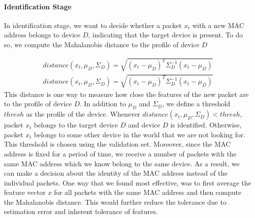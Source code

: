 \paragraph{Identification Stage} In identification stage, we want to decide whether a packet $x_t$ with a new MAC address belongs to device $D$, indicating that the target device is present. To do so, we compute the Mahalanobis distance to the profile of device $D$

\begin{gather*}
    distance(x_t,\mu_D,\Sigma_D) = \sqrt{(x_t-\mu_D)^T\Sigma_D^{-1}(x_t-\mu_D)}
\end{gather*}
\begin{gather*}
    distance(x_t,\mu_D,\Sigma_D) = \sqrt{(x_t-\mu_D)^T\Sigma_D^{-1}(x_t-\mu_D)}
\end{gather*}
This distance is one way to measure how close the features of the new packet are to the profile of device $D$. In addition to $\mu_D$ and $\Sigma_D$, we define a threshold $thresh$ as the profile of the device. Whenever $distance(x_t,\mu_D,\Sigma_D)<thresh$, packet $x_t$ belongs to the target device $D$ and device $D$ is identified. Otherwise, packet $x_t$ belongs to some other device in the world that we are not looking for. This threshold is chosen using the validation set.
Moreover, since the MAC address is fixed for a period of time, we receive a number of packets with the same MAC address which we know belong to the same device. As a result, we can make a decision about the identity of the MAC address instead of the individual packets. One way that we found most effective, was to first average the feature vector $x$ for all packets with the same MAC address and then compute the Mahalanobis distance. This would further reduce the tolerance due to estimation error and inherent tolerance of features.


\fi


